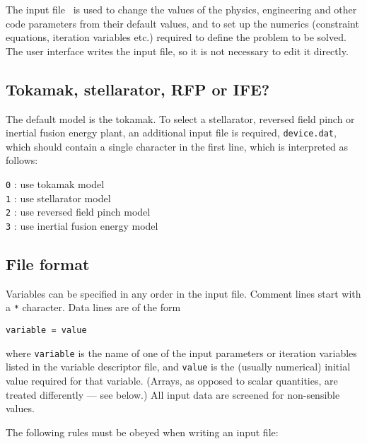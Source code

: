 \label{app:infile}

The input file \indat\ is used to change the values of the physics,
engineering and other code parameters from their default values, and to set up
the numerics (constraint equations, iteration variables etc.) required to
define the problem to be solved.  The user interface writes the input file, so it is not necessary to edit it directly.

\subsection{Tokamak, stellarator, RFP or IFE?}
\label{sec:device}

The default model is the tokamak.  To select a stellarator, reversed field pinch or inertial fusion energy plant, an additional input file is required, \texttt{device.dat}, which should contain a single character in the first
line, which is interpreted as follows:
\begin{tabbing}
\hspace{15mm}\= \texttt{0} : use tokamak model \\
\> \texttt{1} : use stellarator model \\
\> \texttt{2} : use reversed field pinch model \\
\> \texttt{3} : use inertial fusion energy model
\end{tabbing}

\subsection{File format}

Variables can be specified in any order in the input file.  Comment lines start with a \texttt{*} character.  Data lines are of the form
\begin{verbatim}
variable = value
\end{verbatim}
where \texttt{variable} is the name of one of the input parameters or
iteration variables listed in the variable descriptor file, and \texttt{value}
is the (usually numerical) initial value required for that variable. (Arrays,
as opposed to scalar quantities, are treated differently --- see below.) All input data are screened for non-sensible values.

The following rules must be obeyed when writing an input file:

